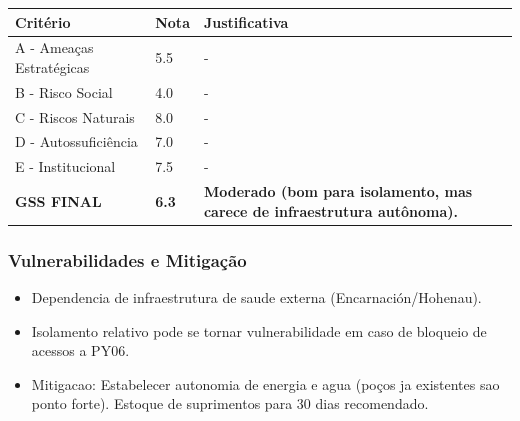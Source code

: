 \begin{table}[ht!]
\small \begin{tabular}{p{3.0cm}p{0.8cm}p{6.0cm}} \toprule
\textbf{Critério} & \textbf{Nota} & \textbf{Justificativa} \\ \midrule
A - Ameaças Estratégicas & 5.5 & - \\
B - Risco Social & 4.0 & - \\
C - Riscos Naturais & 8.0 & - \\
D - Autossuficiência & 7.0 & - \\
E - Institucional & 7.5 & - \\
\midrule \textbf{GSS FINAL} & \textbf{6.3} & \textbf{Moderado (bom para isolamento, mas carece de infraestrutura autônoma).} \\ \bottomrule \end{tabular}
\end{table}
\subsubsection{Vulnerabilidades e
Mitigação}

\begin{itemize}
\tightlist
\item
  Dependencia de infraestrutura de saude externa (Encarnación/\allowbreak Hohenau).
\item
  Isolamento relativo pode se tornar vulnerabilidade em caso de bloqueio
  de acessos a PY06.
\item
  Mitigacao: Estabelecer autonomia de energia e agua (poços ja
  existentes sao ponto forte). Estoque de suprimentos para 30 dias
  recomendado.
\end{itemize}
